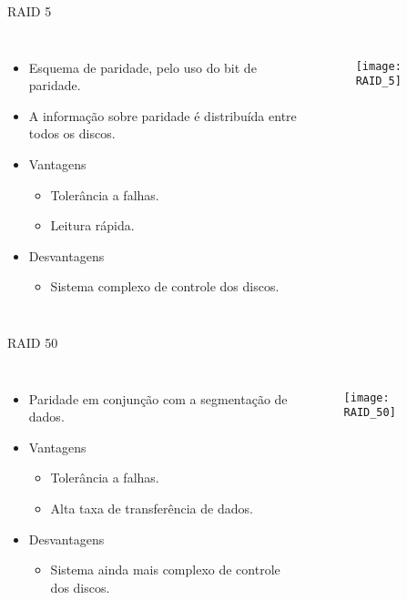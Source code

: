 \begin{frame}{RAID 5}
	\begin{columns}
		\begin{itemize}
			\item Esquema de paridade, pelo uso do bit de paridade.
			\item A informação sobre paridade é distribuída entre todos os discos.
			\item Vantagens
			\begin{itemize}
				\item Tolerância a falhas.
				\item Leitura rápida.
			\end{itemize}
			\item Desvantagens
			\begin{itemize}
				\item Sistema complexo de controle dos discos.
			\end{itemize}
		\end{itemize}
		
		\begin{figure}
			\texttt{[image: RAID\_5]}
			\label{fig:exemplo}
		\end{figure}
		
	\end{columns}
\end{frame}

\begin{frame}{RAID 50}
	\begin{columns}
		\column{0.5\textwidth}
		\begin{itemize}
			\item Paridade em conjunção com a segmentação de dados.
			\item Vantagens
			\begin{itemize}
				\item Tolerância a falhas.
				\item Alta taxa de transferência de dados.
			\end{itemize}
			\item Desvantagens
			\begin{itemize}
				\item Sistema ainda mais complexo de controle dos discos.
			\end{itemize}
		\end{itemize}
		
		\column{0.5\textwidth}
		\begin{figure}
			\texttt{[image: RAID\_50]}
			\label{fig:exemplo}
		\end{figure}
		
	\end{columns}
\end{frame}


